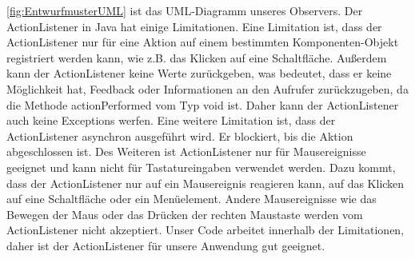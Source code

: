 \autoref{fig:EntwurfmusterUML} ist das UML-Diagramm unseres Observers. Der ActionListener in Java hat einige Limitationen. Eine Limitation ist, dass der ActionListener nur für eine Aktion auf einem bestimmten Komponenten-Objekt registriert werden kann, wie z.B. das Klicken auf eine Schaltfläche. Außerdem kann der ActionListener keine Werte zurückgeben, was bedeutet, dass er keine Möglichkeit hat, Feedback oder Informationen an den Aufrufer zurückzugeben, da die Methode actionPerformed vom Typ void ist. Daher kann der ActionListener auch keine Exceptions werfen.
Eine weitere Limitation ist, dass der ActionListener asynchron ausgeführt wird. Er blockiert, bis die Aktion abgeschlossen ist.
Des Weiteren ist ActionListener nur für Mausereignisse geeignet und kann nicht für Tastatureingaben verwendet werden. Dazu kommt, dass der ActionListener nur auf ein Mausereignis reagieren kann, auf das Klicken auf eine Schaltfläche oder ein Menüelement. Andere Mausereignisse wie das Bewegen der Maus oder das Drücken der rechten Maustaste werden vom ActionListener nicht akzeptiert. Unser Code arbeitet innerhalb der Limitationen, daher ist der ActionListener für unsere Anwendung gut geeignet. 
